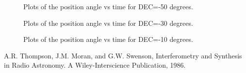 \begin{figure}
\caption{Plots of the position angle vs time for DEC=-50 degrees.}
                  \label{fig:9}
\end{figure}

\begin{figure}
\caption{Plots of the position angle vs time for DEC=-30 degrees.}
                  \label{fig:10}
\end{figure}

\begin{figure}
\caption{Plots of the position angle vs time for DEC=-10 degrees.}
                  \label{fig:11}
\end{figure}


\begin{thebibliography}{99}
   A.R. Thompson, J.M. Moran, and G.W. Swenson, Interferometry and Synthesis in Radio Astronomy. A Wiley-Interscience Publication, 1986.
\end{thebibliography}









